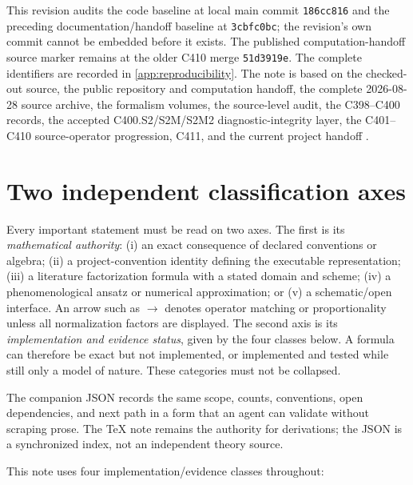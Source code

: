 \documentclass[11pt,oneside]{book}
\begin{document}
This revision audits the code baseline at local main commit \texttt{186cc816} and the preceding documentation/handoff baseline at \texttt{3cbfc0bc}; the revision's own commit cannot be embedded before it exists.  The published computation-handoff source marker remains at the older C410 merge \texttt{51d3919e}.  The complete identifiers are recorded in \cref{app:reproducibility}.  The note is based on the checked-out source, the public repository and computation handoff, the complete 2026-08-28 source archive, the formalism volumes, the source-level audit, the C398--C400 records, the accepted C400.S2/S2M/S2M2 diagnostic-integrity layer, the C401--C410 source-operator progression, C411, and the current project handoff \cite{DeuteronWignerRepo2026,DWGTMDTechnicalDraft2026,DWFormalVolumes2026,DWSourceAudit2026,DWC398Record2026,DWC399Record2026,DWC400ScienceLock2026,DWC400P1Record2026,DWC400S2Record2026,DWC401C410Record2026,DWC411Record2026,DWCurrentHandoff2026}.

\section*{Two independent classification axes}

Every important statement must be read on two axes.  The first is its \emph{mathematical authority}: (i) an exact consequence of declared conventions or algebra; (ii) a project-convention identity defining the executable representation; (iii) a literature factorization formula with a stated domain and scheme; (iv) a phenomenological ansatz or numerical approximation; or (v) a schematic/open interface.  An arrow such as $\longrightarrow$ denotes operator matching or proportionality unless all normalization factors are displayed.  The second axis is its \emph{implementation and evidence status}, given by the four classes below.  A formula can therefore be exact but not implemented, or implemented and tested while still only a model of nature.  These categories must not be collapsed.

The companion JSON records the same scope, counts, conventions, open dependencies, and next path in a form that an agent can validate without scraping prose.  The \TeX{} note remains the authority for derivations; the JSON is a synchronized index, not an independent theory source.

This note uses four implementation/evidence classes throughout:
\end{document}
